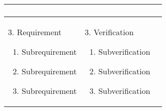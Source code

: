 \begin{table}[H]
\begin{tabularx}{\textwidth}{|*{2}{@{\quad}X|}>{\centering\arraybackslash}p{2cm}|}
{\begin{enumerate}
            \end{enumerate}
        }&  \\ \hline
        { %
            3. Requirement
            \begin{enumerate}
                \item Subrequirement
                \item Subrequirement
                \item Subrequirement
            \end{enumerate}
        }& 
        { %
            3. Verification
            \begin{enumerate}
                \item Subverification
                \item Subverification
                \item Subverification
            \end{enumerate}
        }&  \\ \hline
    \end{tabularx}
    \renewcommand\theenumi{\arabic{enumi}}
\end{table}
